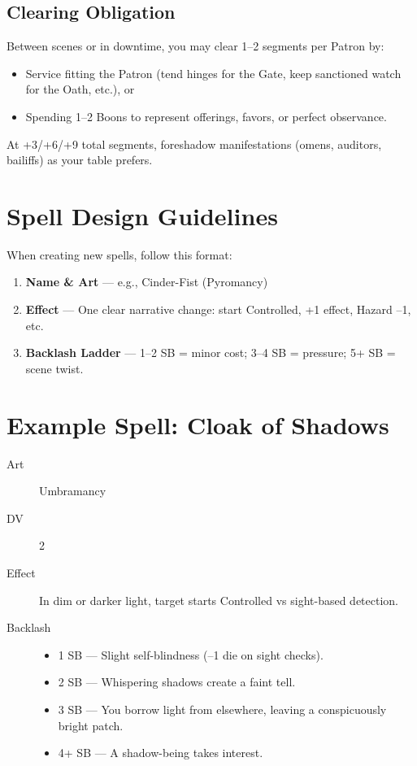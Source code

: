 \subsection*{Clearing Obligation}
Between scenes or in downtime, you may clear 1–2 segments per Patron by:
\begin{itemize}
    \item Service fitting the Patron (tend hinges for the Gate, keep sanctioned watch for the Oath, etc.), or
    \item Spending 1–2 Boons to represent offerings, favors, or perfect observance.
\end{itemize}
At +3/+6/+9 total segments, foreshadow manifestations (omens, auditors, bailiffs) as your table prefers.

\section{Spell Design Guidelines}

When creating new spells, follow this format:

\begin{enumerate}
  \item \textbf{Name \& Art} — e.g., Cinder-Fist (Pyromancy)
  \item \textbf{Effect} — One clear narrative change: start Controlled, +1 effect, Hazard –1, etc.
  \item \textbf{Backlash Ladder} — 1–2 SB = minor cost; 3–4 SB = pressure; 5+ SB = scene twist.
\end{enumerate}

\section{Example Spell: Cloak of Shadows}

\begin{description}
  \item[Art] Umbramancy
  \item[DV] 2
  \item[Effect] In dim or darker light, target starts Controlled vs sight-based detection.
  \item[Backlash]
    \begin{itemize}
      \item 1 SB — Slight self-blindness (–1 die on sight checks).
      \item 2 SB — Whispering shadows create a faint tell.
      \item 3 SB — You borrow light from elsewhere, leaving a conspicuously bright patch.
      \item 4+ SB — A shadow-being takes interest.
    \end{itemize}
\end{description}

